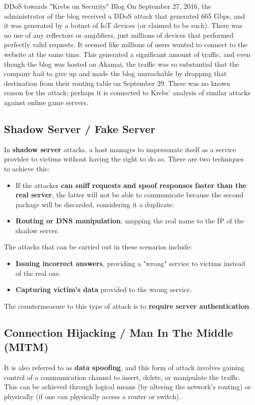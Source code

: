 \begin{casehistory}{{DDoS towards "Krebs on Security" Blog}}
  On September 27, 2016, the administrator of the blog received a DDoS attack that generated 665 Gbps, and it was generated by a botnet of IoT devices (or claimed to be such).
  There was no use of any reflectors or amplifiers, just millions of devices that performed perfectly valid requests.
  It seemed like millions of users wanted to connect to the website at the same time. This generated a significant amount of traffic, and even though the blog was hosted on Akamai, the traffic was so substantial that the company had to give up and made the blog unreachable by dropping that destination from their routing table on September 29.
  There was no known reason for the attack; perhaps it is connected to Krebs' analysis of similar attacks against online game servers.
\end{casehistory}


\subsection{Shadow Server / Fake Server}
In \textbf{shadow server} attacks, a host manages to impersonate itself as a service provider to victims without having the right to do so. There are two techniques to achieve this:
\begin{itemize}
  \item If the attacker \textbf{can sniff requests and spoof responses faster than the real server}, the latter will not be able to communicate because the second package will be discarded, considering it a duplicate.
  \item \textbf{Routing or DNS manipulation}, mapping the real name to the IP of the shadow server.
\end{itemize}

The attacks that can be carried out in these scenarios include:
\begin{itemize}
  \item \textbf{Issuing incorrect answers}, providing a "wrong" service to victims instead of the real one.
  \item \textbf{Capturing victim's data} provided to the wrong service.
\end{itemize}
The countermeasure to this type of attack is to \textbf{require server authentication}.


\subsection{Connection Hijacking / Man In The Middle (MITM)}
It is also referred to as \textbf{data spoofing}, and this form of attack involves gaining control of a communication channel to insert, delete, or manipulate the traffic. This can be achieved through logical means (by altering the network's routing) or physically (if one can physically access a router or switch).

